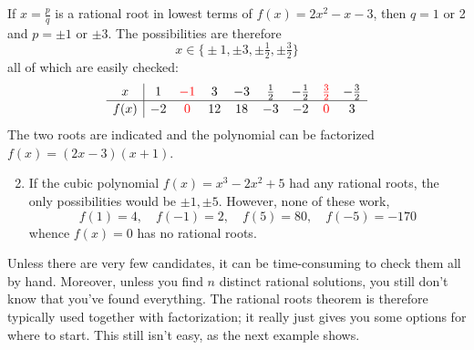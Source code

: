\begin{examples}{}{}
	\exstart If $x=\frac pq$ is a rational root in lowest terms of $f(x)=2x^2-x-3$, then $q=1$ or 2 and $p=\pm 1$ or $\pm 3$. The possibilities are therefore
	\[
		x\in\bigl\{\pm 1,\pm 3,\pm\tfrac 12,\pm\tfrac 32\bigr\}
	\]
	all of which are easily checked:
	\[
		\def\arraystretch{1.1}
		\begin{array}{c|cccccccc}
			x&1&\textcolor{red}{-1}&3&-3&\frac 12&-\frac 12&\textcolor{red}{\frac 32}&-\frac 32\\\hline
			f(x)&-2&\textcolor{red}{0}&12&18&-3&-2&\textcolor{red}{0}&3
		\end{array}
	\]
	The two roots are indicated and the polynomial can be factorized $f(x)=(2x-3)(x+1)$.
	\begin{enumerate}\setcounter{enumi}{1}
	  \item If the cubic polynomial $f(x)=x^3-2x^2+5$ had any rational roots, the only possibilities would be $\pm 1, \pm 5$. However, none of these work,
	  \[
	  	f(1)=4,\quad f(-1)=2,\quad f(5)=80,\quad f(-5)=-170
	  \]
	  whence $f(x)=0$ has no rational roots.
	\end{enumerate}
\end{examples}

Unless there are very few candidates, it can be time-consuming to check them all by hand. Moreover, unless you find $n$ distinct rational solutions, you still don't know that you've found everything. The rational roots theorem is therefore typically used together with factorization; it really just gives you some options for where to start. This still isn't easy, as the next example shows.
\goodbreak

